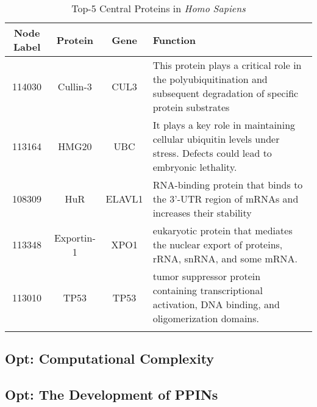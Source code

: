 \begin{table}[h]%
	\centering
	\caption{Top-5 Central Proteins in \textit{Homo Sapiens}}
	\begin{tabular}{cccl}
		Node Label & Protein & Gene & Function \\
		\midrule
		114030 & Cullin-3 & CUL3 & This protein plays a critical role in the polyubiquitination and subsequent degradation of specific protein substrates \\
		113164 & HMG20 &  UBC & It plays a key role in maintaining cellular ubiquitin levels under stress. Defects could lead to embryonic lethality. \\
		108309 & HuR & ELAVL1 & RNA-binding protein that binds to the 3'-UTR region of mRNAs and increases their stability \\
		113348 & Exportin-1 & XPO1 &  eukaryotic protein that mediates the nuclear export of proteins, rRNA, snRNA, and some mRNA. \\
		113010 & TP53 & TP53 & tumor suppressor protein containing transcriptional activation, DNA binding, and oligomerization domains.  \\
		\bottomrule
		\label{tab:central}
	\end{tabular}
\end{table}

\subsection{Opt: Computational Complexity}

\subsection{Opt: The Development of PPINs} 
